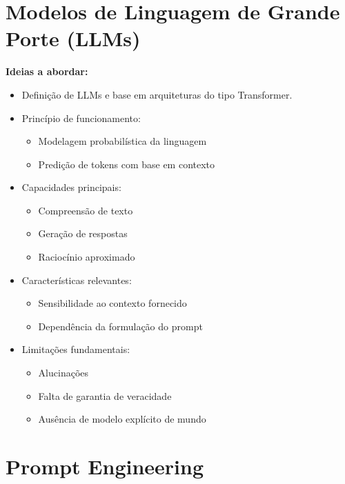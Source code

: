 \section{Modelos de Linguagem de Grande Porte (LLMs)}
\label{subsec:llms}

\textbf{Ideias a abordar:}
\begin{itemize}
    \item Definição de LLMs e base em arquiteturas do tipo Transformer.
    \item Princípio de funcionamento:
    \begin{itemize}
        \item Modelagem probabilística da linguagem
        \item Predição de tokens com base em contexto
    \end{itemize}
    \item Capacidades principais:
    \begin{itemize}
        \item Compreensão de texto
        \item Geração de respostas
        \item Raciocínio aproximado
    \end{itemize}
    \item Características relevantes:
    \begin{itemize}
        \item Sensibilidade ao contexto fornecido
        \item Dependência da formulação do prompt
    \end{itemize}
    \item Limitações fundamentais:
    \begin{itemize}
        \item Alucinações
        \item Falta de garantia de veracidade
        \item Ausência de modelo explícito de mundo
    \end{itemize}
\end{itemize}





\section{Prompt Engineering}
\label{subsec:prompt}

